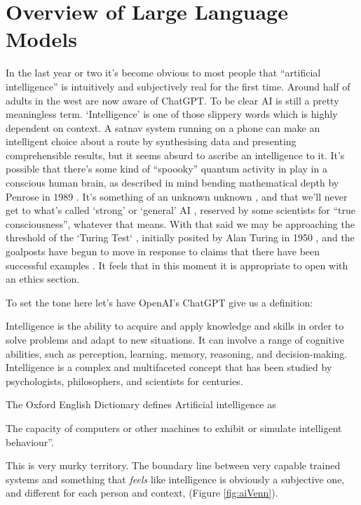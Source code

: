 \section{Overview of Large Language Models}
In the last year or two it's become obvious to most people that ``artificial intelligence'' is intuitively and subjectively real for the first time. Around half of adults in the west are now aware of ChatGPT. To be clear AI is still a pretty meaningless term. `Intelligence' is one of those slippery words which is highly dependent on context. A satnav system running on a phone can make an intelligent choice about a route by synthesising data and presenting comprehensible results, but it seems absurd to ascribe an intelligence to it. It's possible that there's some kind of ``spoooky'' quantum activity in play in a conscious human brain, as described in mind bending mathematical depth by Penrose in 1989 \cite{penrose1990emperor}. It's something of an unknown unknown \cite{kerskens2022experimental}, and that we'll never get to what's called `strong' or `general' AI \cite{larson2021myth, searle1980minds}, reserved by some scientists for ``true consciousness'', whatever that means. With that said we may be approaching the threshold of the `Turing Test` \cite{sep-turing-test}, initially posited by Alan Turing in 1950 \cite{turing1950computing}, and the goalposts have begun to move in response to claims that there have been successful examples \cite{warwick2016can, french2012moving, french2000turing, searle2009turing}. It feels that in this moment it is appropriate to open with an ethics section.\par
To set the tone here let's have OpenAI's ChatGPT give us a definition:
\begin{tcolorbox}[enhanced, frame style={fill=lightgray}, interior style={fill=lightgray}]Intelligence is the ability to acquire and apply knowledge and skills in order to solve problems and adapt to new situations. It can involve a range of cognitive abilities, such as perception, learning, memory, reasoning, and decision-making. Intelligence is a complex and multifaceted concept that has been studied by psychologists, philosophers, and scientists for centuries.
\end{tcolorbox}
The Oxford English Dictionary defines Artificial intelligence as 
\begin{tcolorbox}[enhanced, frame style={fill=lightgray}, interior style={fill=lightgray}]The capacity of computers or other machines to exhibit or simulate intelligent behaviour''.
\end{tcolorbox} 
This is very murky territory. The boundary line between very capable trained systems and something that \textit{feels} like intelligence is obviously a subjective one, and different for each person and context, (Figure \ref{fig:aiVenn}).\par

